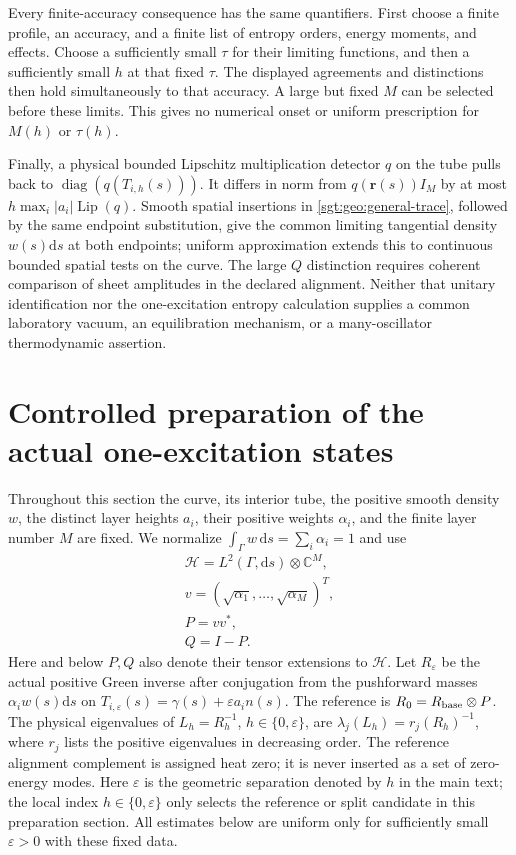 \documentclass[aps,pra,reprint,superscriptaddress,longbibliography]{revtex4-2}
\newcommand{\dd}{\mathrm d}
\begin{document}
Every finite-accuracy consequence has the same quantifiers.  First
choose a finite profile, an accuracy, and a finite list of entropy
orders, energy moments, and effects.  Choose a sufficiently small
$\tau$ for their limiting functions, and then a sufficiently small
$h$ at that fixed $\tau$.  The displayed agreements and distinctions
then hold simultaneously to that accuracy.  A large but fixed $M$
can be selected before these limits.  This gives no numerical onset
or uniform prescription for $M(h)$ or $\tau(h)$.

Finally, a physical bounded Lipschitz multiplication detector $q$ on
the tube pulls back to
$\operatorname{diag}(q(T_{i,h}(s)))$.  It differs in norm from
$q(\mathbf r(s))I_M$ by at most
$h\max_i|a_i|\operatorname{Lip}(q)$.
Smooth spatial insertions in \eqref{sgt:geo:general-trace}, followed
by the same endpoint substitution, give the common limiting
tangential density $w(s)\dd s$ at both endpoints; uniform approximation
extends this to continuous bounded spatial tests on the curve.
The large $Q$ distinction requires coherent comparison of sheet
amplitudes in the declared alignment.  Neither that unitary
identification nor the one-excitation entropy calculation supplies
a common laboratory vacuum, an equilibration mechanism, or a
many-oscillator thermodynamic assertion.

\section{Controlled preparation of the actual one-excitation states}
\label{sgt:prep:appendix}

Throughout this section the curve, its interior tube, the positive smooth
density $w$, the distinct layer heights $a_i$, their positive weights
$\alpha_i$, and the finite layer number $M$ are fixed. We normalize
$\int_\Gamma w\,\dd s=\sum_i\alpha_i=1$ and use
\[
\begin{gathered}
 \mathcal H=L^2(\Gamma,\dd s)\otimes\mathbb C^M,\\
 v=(\sqrt{\alpha_1},\ldots,\sqrt{\alpha_M})^T,\\
 P=vv^*,\\
 Q=I-P.
\end{gathered}
\]
Here and below $P,Q$ also denote their tensor extensions to $\mathcal H$.
Let $R_\varepsilon$ be the actual positive Green inverse after conjugation
from the pushforward masses $\alpha_iw(s)\dd s$ on
$T_{i,\varepsilon}(s)=\gamma(s)+\varepsilon a_i n(s)$.
The reference is $R_0=R_{\rm base}\otimes P$.
The physical eigenvalues of $L_h=R_h^{-1}$, $h\in\{0,\varepsilon\}$,
are $\lambda_j(L_h)=r_j(R_h)^{-1}$, where $r_j$ lists the positive
eigenvalues in decreasing order. The reference alignment complement is
assigned heat zero; it is never inserted as a set of zero-energy modes.
Here $\varepsilon$ is the geometric separation denoted by $h$ in the
main text; the local index $h\in\{0,\varepsilon\}$ only selects the
reference or split candidate in this preparation section.
All estimates below are uniform only for sufficiently small
$\varepsilon>0$ with these fixed data.
\end{document}
